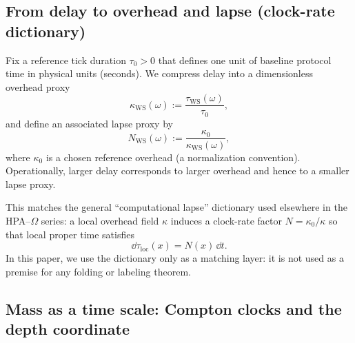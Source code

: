 \subsection{From delay to overhead and lapse (clock-rate dictionary)}
\label{app:delay_to_lapse_dictionary}

Fix a reference tick duration $\tau_0>0$ that defines one unit of baseline protocol time in physical units (seconds).
We compress delay into a dimensionless overhead proxy
\begin{equation}
\label{eq:kappa_ws_def}
\kappa_{\mathrm{WS}}(\omega):=\frac{\tau_{\mathrm{WS}}(\omega)}{\tau_0},
\end{equation}
and define an associated lapse proxy by
\begin{equation}
\label{eq:lapse_ws_def}
N_{\mathrm{WS}}(\omega):=\frac{\kappa_0}{\kappa_{\mathrm{WS}}(\omega)},
\end{equation}
where $\kappa_0$ is a chosen reference overhead (a normalization convention).
Operationally, larger delay corresponds to larger overhead and hence to a smaller lapse proxy.

This matches the general ``computational lapse'' dictionary used elsewhere in the HPA--$\Omega$ series: a local overhead field $\kappa$ induces a clock-rate factor $N=\kappa_0/\kappa$ so that local proper time satisfies
\begin{equation}
\label{eq:dtau_lapse_dictionary}
\dd\tau_{\mathrm{loc}}(x)=N(x)\,\dd t.
\end{equation}
In this paper, we use the dictionary only as a matching layer: it is not used as a premise for any folding or labeling theorem.

\subsection{Mass as a time scale: Compton clocks and the depth coordinate}
\label{app:compton_clock_dictionary}

